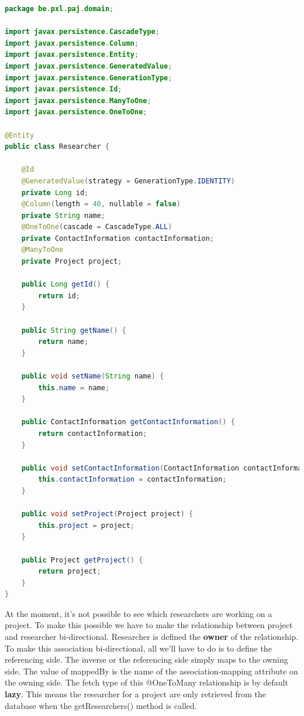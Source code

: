 \begin{lstlisting}[frame=single,language=java]
package be.pxl.paj.domain;

import javax.persistence.CascadeType;
import javax.persistence.Column;
import javax.persistence.Entity;
import javax.persistence.GeneratedValue;
import javax.persistence.GenerationType;
import javax.persistence.Id;
import javax.persistence.ManyToOne;
import javax.persistence.OneToOne;

@Entity
public class Researcher {

	@Id
	@GeneratedValue(strategy = GenerationType.IDENTITY)
	private Long id;
	@Column(length = 40, nullable = false)
	private String name;
	@OneToOne(cascade = CascadeType.ALL)
	private ContactInformation contactInformation;
	@ManyToOne
	private Project project;

	public Long getId() {
		return id;
	}

	public String getName() {
		return name;
	}

	public void setName(String name) {
		this.name = name;
	}

	public ContactInformation getContactInformation() {
		return contactInformation;
	}

	public void setContactInformation(ContactInformation contactInformation) {
		this.contactInformation = contactInformation;
	}

	public void setProject(Project project) {
		this.project = project;
	}

	public Project getProject() {
		return project;
	}
}
\end{lstlisting}

At the moment, it's not possible to see which researchers are working on a project. To make this possible we have to make the relationship between project and researcher bi-directional.  Researcher is defined the \textbf{owner} of the relationship. To make this association bi-directional, all we'll have to do is to define the referencing side. The inverse or the referencing side simply maps to the owning side.  The value of mappedBy is the name of the association-mapping attribute on the owning side.  The fetch type of this @OneToMany relationship is by default \textbf{lazy}. This means the researcher for a project are only retrieved from the database when the getResearchers() method is called.

